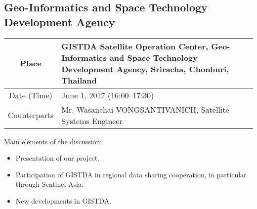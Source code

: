 \subsection{Geo-Informatics and Space Technology Development Agency}

\begin{table}[H]
   \centering
   \begin{tabular}{| c | p{12 cm} |}
   \hline
    Place & GISTDA Satellite Operation Center, Geo-Informatics and Space Technology Development Agency, Sriracha, Chonburi, Thailand \\ \hline
    Date (Time) & June 1, 2017 (16:00--17:30) \\ \hline
    Counterparts & Mr. Wasanchai VONGSANTIVANICH, Satellite Systems Engineer \\ \hline   
   \end{tabular}
\end{table}

Main elements of the discussion:

\begin{itemize}

\item Presentation of our project.

\item Participation of GISTDA in regional data sharing cooperation, in particular through Sentinel Asia.

\item New developments in GISTDA.

\end{itemize}















